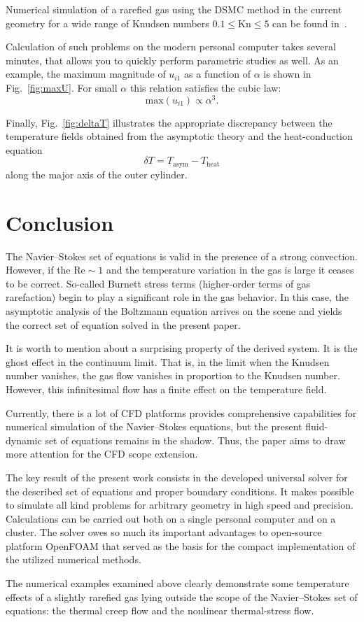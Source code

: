 \documentclass[smallextended, referee]{svjour3} %
\newcommand{\Kn}{\mathrm{Kn}}
\begin{document}
Numerical simulation of a rarefied gas using the DSMC method in the current geometry
for a wide range of Knudsen numbers \(0.1\le\Kn\le5\) can be found in~\cite{SoneCoaxial}.

Calculation of such problems on the modern personal computer takes several minutes,
that allows you to quickly perform parametric studies as well. As an example,
the maximum magnitude of \(u_{i1}\) as a function of \(\alpha\) is shown in Fig.~\ref{fig:maxU}.
For small \(\alpha\) this relation satisfies the cubic law:
\begin{equation}
	\mathrm{max}(u_{i1}) \propto \alpha^3.
\end{equation}

Finally, Fig.~\ref{fig:deltaT} illustrates the appropriate discrepancy between the temperature fields
obtained from the asymptotic theory and the heat-conduction equation
\[ \delta T = T_\mathrm{asym} - T_\mathrm{heat} \]
along the major axis of the outer cylinder.

\section{Conclusion}

The Navier--Stokes set of equations is valid in the presence of a strong convection.
However, if the \(\mathrm{Re} \sim 1\) and the temperature variation in the gas is large
it ceases to be correct. So-called Burnett stress terms (higher-order terms of gas rarefaction)
begin to play a significant role in the gas behavior.
In this case, the asymptotic analysis of the Boltzmann equation arrives on the scene and yields
the correct set of equation solved in the present paper.

It is worth to mention about a surprising property of the derived system. It is the ghost effect
in the continuum limit. That is, in the limit when the Knudsen number vanishes,
the gas flow vanishes in proportion to the Knudsen number. However, this infinitesimal flow
has a finite effect on the temperature field.

Currently, there is a lot of CFD platforms provides comprehensive capabilities for
numerical simulation of the Navier--Stokes equations, but the present fluid-dynamic
set of equations remains in the shadow. Thus, the paper aims to
draw more attention for the CFD scope extension.

The key result of the present work consists in the developed universal solver for
the described set of equations and proper boundary conditions. It makes possible to
simulate all kind problems for arbitrary geometry in high speed and precision.
Calculations can be carried out both on a single personal computer and on a cluster.
The solver owes so much its important advantages to open-source platform OpenFOAM\textregistered{}
that served as the basis for the compact implementation of the utilized numerical methods.

The numerical examples examined above clearly demonstrate some temperature effects of
a slightly rarefied gas lying outside the scope of the Navier--Stokes set of equations:
the thermal creep flow and the nonlinear thermal-stress flow.


\end{document}
